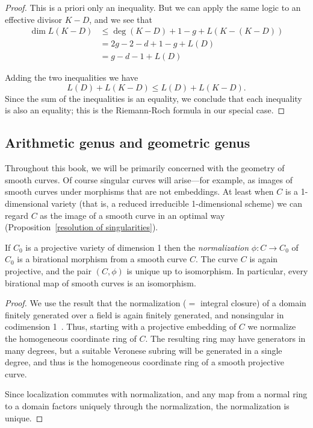 \begin{proof}
This is a priori only an inequality. But we can apply the same logic to an effective divisor $K-D$, and we see that
\begin{align*}
\dim L(K-D) &\leq \deg(K-D) + 1 - g + L(K - (K-D)) \\
& = 2g - 2 - d + 1 - g  + L(D) \\
&= g - d - 1 + L(D)
\end{align*}

Adding the two inequalities we have
$$
L(D) + L(K-D) \leq L(D) + L(K-D).
$$
Since the sum of the inequalities is an equality, we conclude that each inequality is also an equality; this is the Riemann-Roch formula
in our special case.
\end{proof}

\subsection{Arithmetic genus and geometric genus}\label{pa and pg}

Throughout this book, we will be primarily concerned with the geometry of smooth curves. Of course singular curves will arise---for example, as images of smooth curves under morphisms that are not embeddings. At least when $C$ is a 1-dimensional variety (that is, a 
reduced irreducible 1-dimensional scheme) we can  regard $C$ as the image of a smooth curve in an optimal way (Proposition~\ref{resolution of singularities}).

\begin{proposition}\label{resolution of singularities}
If $C_0$ is a projective variety of dimension 1 then the \emph{normalization} $\phi: C \to C_0$ of $C_0$ is a birational
morphism from a smooth curve $C$. The curve $C$ is again projective, and the pair $(C, \phi)$ is
unique up to  isomorphism. In particular, every birational map of smooth curves is an isomorphism.
\end{proposition}
 
\begin{proof}
  We use the result that the normalization ($=$ integral closure) of a domain
finitely generated over a field is again finitely generated, and nonsingular in codimension 1~\cite[Theorem 4.14 and 11.5]{Eisenbud1995}. Thus,
starting with a projective embedding of $C$ we normalize the homogeneous coordinate ring of $C$. The resulting ring
may have generators in many degrees, but a suitable Veronese subring will be generated in a single degree, and thus
is the homogeneous coordinate ring of a smooth projective curve. 

Since localization
commutes with normalization, and any map from a normal ring to a domain factors uniquely through the normalization,
the normalization is unique.
\end{proof}

